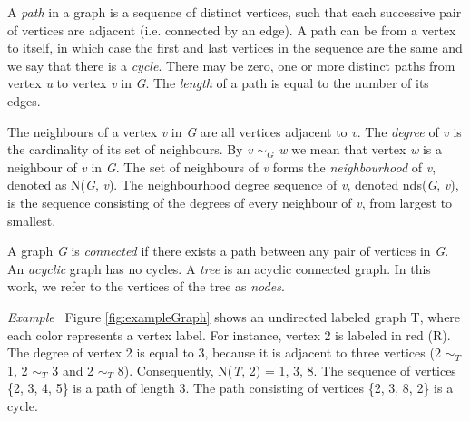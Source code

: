 \documentclass{l4proj}
\newcounter{example}[section]
\newenvironment{example}[1][]{\refstepcounter{example}\par\medskip
   \noindent \textit{Example~\theexample #1} \rmfamily}{\medskip}
\begin{document}
A \emph{path} in a graph is a sequence of distinct vertices, such that each successive pair of vertices are adjacent (i.e. connected by an edge). A path can be from a vertex to itself, in which case the first and last vertices in the sequence are the same and we say that there is a \emph{cycle}. There may be zero, one or more distinct paths from vertex \emph{u} to vertex \emph{v} in \emph{G}. The \emph{length} of a path is equal to the number of its edges.

The neighbours of a vertex \emph{v} in \emph{G} are all vertices adjacent to \emph{v}. The \emph{degree} of \emph{v} is the cardinality of its set of neighbours. By \emph{v} $\sim_{G}$ \textit{w} we mean that vertex \textit{w} is a neighbour of \emph{v} in \emph{G}. The set of neighbours of \emph{v} forms the \emph{neighbourhood} of \emph{v}, denoted as N(\emph{G}, \emph{v}). The neighbourhood degree sequence of \emph{v}, denoted nds(\emph{G}, \emph{v}), is the sequence consisting of the degrees of every neighbour of \emph{v}, from largest to smallest.

A graph \emph{G} is \emph{connected} if there exists a path between any pair of vertices in \emph{G}. An \emph{acyclic} graph has no cycles. A \emph{tree} is an acyclic connected graph. In this work, we refer to the vertices of the tree as \emph{nodes}.

\begin{example}
Figure \ref{fig:exampleGraph} shows an undirected labeled graph T, where each color represents a vertex label. For instance, vertex 2 is labeled in red (R). The degree of vertex 2 is equal to 3, because it is adjacent to three vertices (2 $\sim_{T}$ 1, 2 $\sim_{T}$ 3 and 2 $\sim_{T}$ 8). Consequently, N(\emph{T}, 2) = 1, 3, 8. The sequence of vertices \{2, 3, 4, 5\} is a path of length 3. The path consisting of vertices \{2, 3, 8, 2\} is a cycle.
\end{example}
\end{document}

